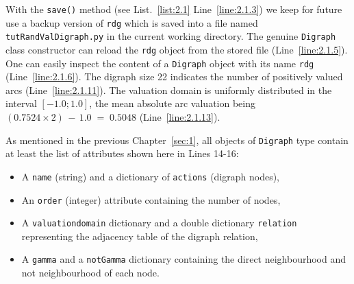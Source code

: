 With the \texttt{save()}  method (see List.~\vref{list:2.1} Line~\ref{line:2.1.3}) we keep for future use a backup version of \texttt{rdg} which is saved into a file named \texttt{tutRandValDi\-graph.py} in the current working directory. The genuine \texttt{Di\-graph} class constructor can reload the \texttt{rdg} object from the stored file (Line~\ref{line:2.1.5}). One can easily inspect the content of a \texttt{Digraph} object with its name \texttt{rdg} (Line~\ref{line:2.1.6}). The digraph size 22 indicates the number of positively valued arcs (Line~\ref{line:2.1.11}). The valuation domain is uniformly distributed in the interval $[-1.0; 1.0]$, the mean absolute arc valuation being $(0.7524 \times 2)\, -\, 1.0 \;=\; 0.5048$ (Line~\ref{line:2.1.13}). 

As mentioned in the previous Chapter~\ref{sec:1}, all objects of \texttt{Digraph} type contain at least the list of attributes shown here in Lines 14-16:
\begin{itemize}[nosep]
\item A \texttt{name} (string) and a dictionary of \texttt{actions} (digraph nodes),
\item An \texttt{order} (integer) attribute containing the number of nodes,
\item A \texttt{valuationdomain} dictionary and a double dictionary \texttt{relation} representing the adjacency table of the digraph relation,
\item A \texttt{gamma} and a {\tt notGamma} dictionary containing the direct neighbourhood and not neighbourhood of each node.
\end{itemize}

